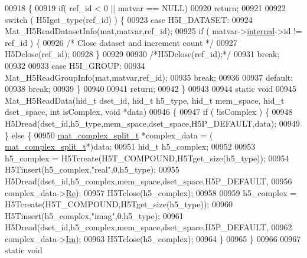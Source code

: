 \begin{DoxyCode}
00918 \{
00919     \textcolor{keywordflow}{if}( ref\_id < 0 || matvar == NULL)
00920         \textcolor{keywordflow}{return};
00921 
00922     \textcolor{keywordflow}{switch} ( H5Iget\_type(ref\_id) ) \{
00923         \textcolor{keywordflow}{case} H5I\_DATASET:
00924             Mat\_H5ReadDatasetInfo(mat,matvar,ref\_id);
00925             \textcolor{keywordflow}{if} ( matvar->\hyperlink{group___m_a_t_a6e97e3ed9f40c49322c18561c2a94e92}{internal}->id != ref\_id ) \{
00926                 \textcolor{comment}{/* Close dataset and increment count */}
00927                 H5Dclose(ref\_id);
00928             \}
00929 
00930             \textcolor{comment}{/*H5Dclose(ref\_id);*/}
00931             \textcolor{keywordflow}{break};
00932 
00933         \textcolor{keywordflow}{case} H5I\_GROUP:
00934             Mat\_H5ReadGroupInfo(mat,matvar,ref\_id);
00935             \textcolor{keywordflow}{break};
00936 
00937         \textcolor{keywordflow}{default}:
00938             \textcolor{keywordflow}{break};
00939     \}
00940 
00941     \textcolor{keywordflow}{return};
00942 \}
00943 
00944 \textcolor{keyword}{static} \textcolor{keywordtype}{void}
00945 Mat\_H5ReadData(hid\_t dset\_id, hid\_t h5\_type, hid\_t mem\_space, hid\_t dset\_space, \textcolor{keywordtype}{int} isComplex, \textcolor{keywordtype}{void} *data)
00946 \{
00947     \textcolor{keywordflow}{if} ( !isComplex ) \{
00948         H5Dread(dset\_id,h5\_type,mem\_space,dset\_space,H5P\_DEFAULT,data);
00949     \} \textcolor{keywordflow}{else} \{
00950         \hyperlink{group___m_a_t_structmat__complex__split__t}{mat\_complex\_split\_t} *complex\_data = (
      \hyperlink{group___m_a_t_structmat__complex__split__t}{mat\_complex\_split\_t}*)data;
00951         hid\_t h5\_complex;
00952 
00953         h5\_complex = H5Tcreate(H5T\_COMPOUND,H5Tget\_size(h5\_type));
00954         H5Tinsert(h5\_complex,\textcolor{stringliteral}{"real"},0,h5\_type);
00955         H5Dread(dset\_id,h5\_complex,mem\_space,dset\_space,H5P\_DEFAULT,
00956                 complex\_data->\hyperlink{group___m_a_t_a484a93607508adac2bce53a0252e0325}{Re});
00957         H5Tclose(h5\_complex);
00958 
00959         h5\_complex = H5Tcreate(H5T\_COMPOUND,H5Tget\_size(h5\_type));
00960         H5Tinsert(h5\_complex,\textcolor{stringliteral}{"imag"},0,h5\_type);
00961         H5Dread(dset\_id,h5\_complex,mem\_space,dset\_space,H5P\_DEFAULT,
00962                 complex\_data->\hyperlink{group___m_a_t_a7182d10b0d3598415887376065440946}{Im});
00963         H5Tclose(h5\_complex);
00964     \}
00965 \}
00966 
00967 \textcolor{keyword}{static} \textcolor{keywordtype}{void}

\end{DoxyCode}
